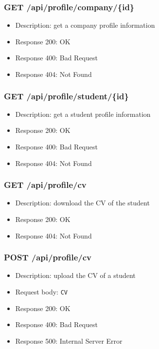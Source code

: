 \subsubsection{GET /api/profile/company/\{id\}}
\begin{itemize}
    \item Description: get a company profile information
    \item Response 200: OK
    \item Response 400: Bad Request
    \item Response 404: Not Found
\end{itemize}

\subsubsection{GET /api/profile/student/\{id\}}
\begin{itemize}
    \item Description: get a student profile information
    \item Response 200: OK
    \item Response 400: Bad Request
    \item Response 404: Not Found
\end{itemize}

\subsubsection{GET /api/profile/cv}
\begin{itemize}
    \item Description: download the CV of the student
    \item Response 200: OK
    \item Response 404: Not Found
\end{itemize}

\subsubsection{POST /api/profile/cv}
\begin{itemize}
    \item Description: upload the CV of a student
    \item Request body: \verb|CV|
    \item Response 200: OK
    \item Response 400: Bad Request
    \item Response 500: Internal Server Error
\end{itemize}

